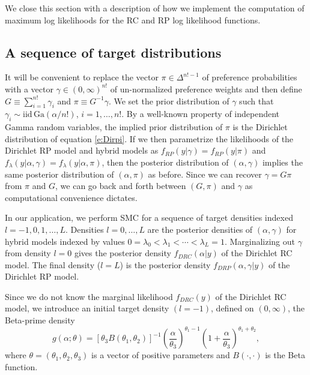 \documentclass[11pt,letter]{article}
\newcommand{\Dpi}{Dirichlet RP model}
\newcommand{\DP}{Dirichlet RC model}
\begin{document}
We close this section with a description of how we implement the computation of maximum log likelihoods for the RC and RP log likelihood functions.

\subsection{A sequence of target distributions}

It will be convenient to replace the vector $\pi \in \Delta^{n!-1}$ of preference probabilities with a vector $\gamma \in (0,\infty)^{n!}$ of un-normalized preference weights and then define $G \equiv \sum_{i=1}^{n!} \gamma_i$ and $\pi \equiv G^{-1} \gamma$.
We set the prior distribution of $\gamma$ such that $\gamma_i \sim \mathrm{iid}\,\mathrm{Ga}(\alpha/n!)$, $i=1,\ldots,n!$.
By a well-known property of independent Gamma random variables, the implied prior distribution of $\pi$ is the Dirichlet distribution of equation \eqref{e:Dirpi}.
If we then parametrize the likelihoods of the \Dpi{} and hybrid models as $f_{RP}(y|\gamma) = f_{RP}(y|\pi)$ and $f_\lambda(y|\alpha,\gamma) = f_\lambda(y|\alpha,\pi)$, then the posterior distribution of $(\alpha,\gamma)$ implies the same posterior distribution of $(\alpha,\pi)$ as before.
Since we can recover $\gamma = G \pi$ from $\pi$ and $G$, we can go back and forth between $(G,\pi)$ and $\gamma$ as computational convenience dictates.

In our application, we perform SMC for a sequence of target densities indexed $l=-1,0,1,\ldots,L$.
Densities $l=0,\ldots,L$ are the posterior densities of $(\alpha,\gamma)$ for hybrid models indexed by values $0 = \lambda_0 < \lambda_1 < \cdots < \lambda_L = 1$.
Marginalizing out $\gamma$ from density $l=0$ gives the posterior density $f_{DRC}(\alpha|y)$ of the \DP{}.
The final density ($l=L$) is the posterior density $f_{DRP}(\alpha, \gamma|y)$ of the \Dpi{}.

Since we do not know the marginal likelihood $f_{DRC}(y)$ of the \DP{}, we introduce an initial target density $(l=-1)$, defined on $(0,\infty)$, the Beta-prime density
\begin{equation}\label{e:g}
   g(\alpha;\theta) = [\theta_3 B(\theta_1,\theta_2)]^{-1}
   \left( \frac{\alpha}{\theta_3} \right)^{\theta_1 - 1}
   \left( 1 + \frac{\alpha}{\theta_3} \right)^{\theta_1 + \theta_2},
\end{equation}
where $\theta = (\theta_1, \theta_2, \theta_3)$ is a vector of positive parameters and $B(\cdot,\cdot)$ is the Beta function.
\end{document}

